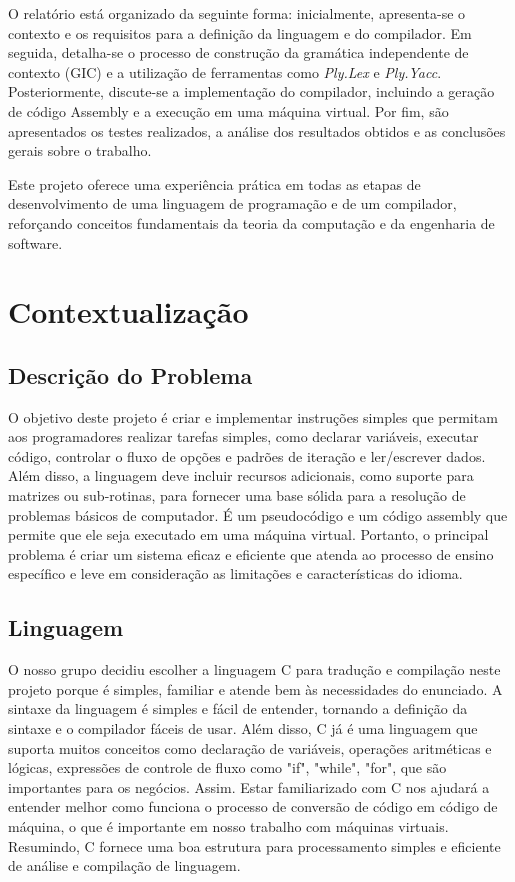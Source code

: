 \documentclass[12pt,a4paper]{report}
\begin{document}
O relatório está organizado da seguinte forma: inicialmente, apresenta-se o contexto e os requisitos para a definição da linguagem e do compilador. Em seguida, detalha-se o processo de construção da gramática independente de contexto (GIC) e a utilização de ferramentas como \emph{Ply.Lex} e \emph{Ply.Yacc}. Posteriormente, discute-se a implementação do compilador, incluindo a geração de código Assembly e a execução em uma máquina virtual. Por fim, são apresentados os testes realizados, a análise dos resultados obtidos e as conclusões gerais sobre o trabalho.

Este projeto oferece uma experiência prática em todas as etapas de desenvolvimento de uma linguagem de programação e de um compilador, reforçando conceitos fundamentais da teoria da computação e da engenharia de software.

\chapter{Contextualiza\c{c}\~{a}o}
\section{Descri\c{c}\~{a}o do Problema}
O objetivo deste projeto é criar e implementar instruções simples que permitam aos programadores realizar tarefas simples, como declarar variáveis, executar código, controlar o fluxo de opções e padrões de iteração e ler/escrever dados. Além disso, a linguagem deve incluir recursos adicionais, como suporte para matrizes ou sub-rotinas, para fornecer uma base sólida para a resolução de problemas básicos de computador. É um pseudocódigo e um código assembly que permite que ele seja executado em uma máquina virtual. Portanto, o principal problema é criar um sistema eficaz e eficiente que atenda ao processo de ensino específico e leve em consideração as limitações e características do idioma.
\section{Linguagem}
O nosso grupo decidiu escolher a linguagem C para tradução e compilação neste projeto porque é simples, familiar e atende bem às necessidades do enunciado. A sintaxe da linguagem é simples e fácil de entender, tornando a definição da sintaxe e o compilador fáceis de usar. Além disso, C já é uma linguagem que suporta muitos conceitos como declaração de variáveis, operações aritméticas e lógicas, expressões de controle de fluxo como "if", "while", "for", que são importantes para os negócios. Assim. Estar familiarizado com C nos ajudará a entender melhor como funciona o processo de conversão de código em código de máquina, o que é importante em nosso trabalho com máquinas virtuais. Resumindo, C fornece uma boa estrutura para processamento simples e eficiente de análise e compilação de linguagem.
\end{document}
